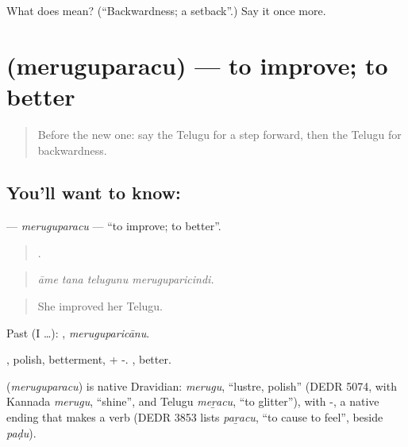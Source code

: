 \begin{tcolorbox}[breakable,colback=teal!4,colframe=teal!35!black,title={Before you move on}]
What does  mean? (\textquotedblleft{}Backwardness; a setback\textquotedblright{}.) Say it once more.
\end{tcolorbox}
\section[\texorpdfstring{\te{మెరుగుపరచు} (meruguparacu)}{మెరుగుపరచు (meruguparacu)}]{ (meruguparacu) — to improve; to better}

\label{lesson:TE-C429-meruguparacu}



\begin{quote}
Before the new one: say the Telugu for a step forward, then the Telugu for backwardness.
\end{quote}

\subsection*{You'll want to know: }
\textbf{} — \emph{meruguparacu} — \textquotedblleft{}to improve; to better\textquotedblright{}.

\begin{quote}
   .
\end{quote}

\begin{quote}
\emph{āme tana telugunu meruguparicindi.}
\end{quote}

\begin{quote}
She improved her Telugu.
\end{quote}

Past (I …): , \emph{meruguparicānu}.

, polish, betterment, + -. , better.

\begin{cousinweb}
\textbf{} (\emph{meruguparacu}) is native Dravidian: \emph{merugu}, \textquotedblleft{}lustre, polish\textquotedblright{} (DEDR 5074, with Kannada \emph{merugu}, \textquotedblleft{}shine\textquotedblright{}, and Telugu \emph{meṟacu}, \textquotedblleft{}to glitter\textquotedblright{}), with -, a native ending that makes a verb (DEDR 3853 lists \emph{paṟacu}, \textquotedblleft{}to cause to feel\textquotedblright{}, beside \emph{paḍu}).
\end{cousinweb}

